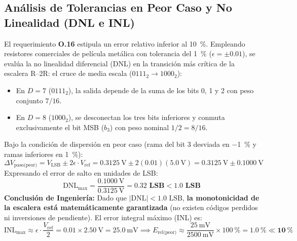 \documentclass[11pt,letterpaper]{article}
\begin{document}
\subsection{Análisis de Tolerancias en Peor Caso y No Linealidad (DNL e INL)}
El requerimiento \textbf{O.16} estipula un error relativo inferior al \SI{10}{\percent}. Empleando resistores comerciales de película metálica con tolerancia del \SI{1}{\percent} ($\epsilon = \pm 0.01$), se evalúa la no linealidad diferencial (DNL) en la transición más crítica de la escalera R--2R: el cruce de media escala ($0111_2 \to 1000_2$):
\begin{itemize}
    \item En $D=7$ ($0111_2$), la salida depende de la suma de los bits 0, 1 y 2 con peso conjunto $7/16$.
    \item En $D=8$ ($1000_2$), se desconectan los tres bits inferiores y conmuta exclusivamente el bit MSB ($b_3$) con peso nominal $1/2 = 8/16$.
\end{itemize}

Bajo la condición de dispersión en peor caso (rama del bit 3 desviada en \SI{-1}{\percent} y ramas inferiores en \SI{+1}{\percent}):
\begin{equation}
\Delta V_{\text{paso(peor)}} = V_{\text{LSB}} \pm 2\epsilon \cdot V_{\text{ref}} = \SI{0.3125}{\volt} \pm 2(0.01)(\SI{5.0}{\volt}) = \SI{0.3125}{\volt} \pm \SI{0.1000}{\volt}
\end{equation}
Expresando el error de salto en unidades de LSB:
\begin{equation}
\mathrm{DNL}_{\text{max}} = \frac{\SI{0.1000}{\volt}}{\SI{0.3125}{\volt}} = \mathbf{0.32\text{ LSB}} < \mathbf{1.0\text{ LSB}}
\label{eq:dnl_calculo}
\end{equation}
\textbf{Conclusión de Ingeniería:} Dado que $|\mathrm{DNL}| < 1.0\text{ LSB}$, \textbf{la monotonicidad de la escalera está matemáticamente garantizada} (no existen códigos perdidos ni inversiones de pendiente). El error integral máximo (INL) es:
\begin{equation}
\mathrm{INL}_{\text{max}} \approx \epsilon \cdot \frac{V_{\text{ref}}}{2} = 0.01 \times \SI{2.50}{\volt} = \SI{25.0}{\milli\volt} \implies E_{\text{rel(peor)}} \approx \frac{\SI{25}{\milli\volt}}{\SI{2500}{\milli\volt}} \times \SI{100}{\percent} = \mathbf{\SI{1.0}{\percent}} \ll \mathbf{\SI{10}{\percent}}
\end{equation}
\end{document}
